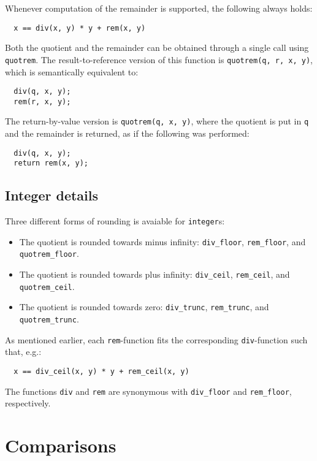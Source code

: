 \documentclass[a4paper]{article}
\begin{document}
Whenever computation of the remainder is supported, the following always holds:
\begin{verbatim}
  x == div(x, y) * y + rem(x, y)
\end{verbatim}

Both the quotient and the remainder can be obtained through a single call using \texttt{quotrem}. The result-to-reference version of this function is \texttt{quotrem(q, r, x, y)}, which is semantically equivalent to:
\begin{verbatim}
  div(q, x, y);
  rem(r, x, y);
\end{verbatim}

The return-by-value version is \texttt{quotrem(q, x, y)}, where the quotient is put in \texttt{q} and the remainder is returned, as if the following was performed:
\begin{verbatim}
  div(q, x, y);
  return rem(x, y);
\end{verbatim}

\subsection{Integer details}

Three different forms of rounding is avaiable for \texttt{integer}s:
\begin{itemize}
\item The quotient is rounded towards minus infinity: \texttt{div\_floor}, \texttt{rem\_floor}, and \texttt{quotrem\_floor}.
\item The quotient is rounded towards plus infinity: \texttt{div\_ceil}, \texttt{rem\_ceil}, and \texttt{quotrem\_ceil}.
\item The quotient is rounded towards zero: \texttt{div\_trunc}, \texttt{rem\_trunc}, and \texttt{quotrem\_trunc}.
\end{itemize}
As mentioned earlier, each \texttt{rem}-function fits the corresponding \texttt{div}-function such that, e.g.:
\begin{verbatim}
  x == div_ceil(x, y) * y + rem_ceil(x, y)
\end{verbatim}

The functions \texttt{div} and \texttt{rem} are synonymous with \texttt{div\_floor} and \texttt{rem\_floor}, respectively.

\section{Comparisons}
\end{document}
